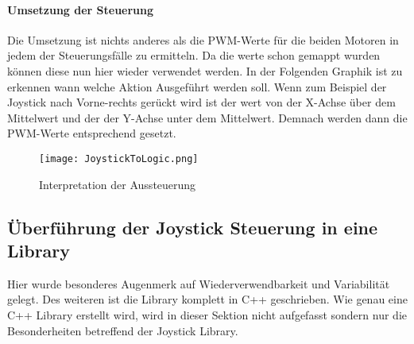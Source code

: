 \documentclass{article}
\begin{document}
\paragraph{Umsetzung der Steuerung}
Die Umsetzung ist nichts anderes als die PWM-Werte für die beiden Motoren in jedem der Steuerungsfälle zu ermitteln. Da die werte schon gemappt wurden können diese nun hier wieder verwendet werden. In der Folgenden Graphik ist zu erkennen wann welche Aktion Ausgeführt werden soll. Wenn zum Beispiel der Joystick nach Vorne-rechts gerückt wird ist der wert von der X-Achse über dem Mittelwert und der der Y-Achse unter dem Mittelwert. Demnach werden dann die PWM-Werte entsprechend gesetzt.
\begin{figure}[h]
	\texttt{[image: JoystickToLogic.png]}
	\centering
	\caption{Interpretation der Aussteuerung}
\end{figure}


\subsection{Überführung der Joystick Steuerung in eine Library} %
Hier wurde besonderes Augenmerk auf Wiederverwendbarkeit und Variabilität gelegt.
Des weiteren ist die Library komplett in C++ geschrieben. Wie genau eine C++ Library erstellt wird, wird in dieser Sektion nicht aufgefasst sondern nur die Besonderheiten betreffend der Joystick Library.
\end{document}
